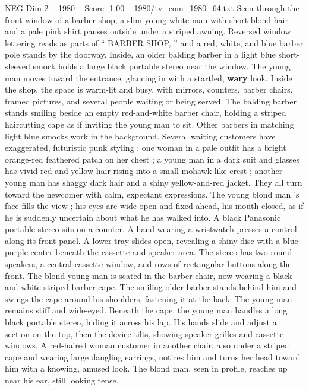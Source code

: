 \begin{textsample}{NEG Dim 2 – 1980 – Score -1.00 – 1980/tv\_com\_1980\_64.txt}  \label{ex:f2_neg_033}
Seen through the front window of a barber shop, a slim young white man with short blond hair and a pale pink shirt pauses outside under a striped awning.
Reversed window lettering reads as parts of “ BARBER SHOP, ” and a red, white, and blue barber pole stands by the doorway.
Inside, an older balding barber in a light blue short-sleeved smock holds a large black portable stereo near the window.
The young man moves toward the entrance, glancing in with a startled, \textbf{wary} look.
Inside the shop, the space is warm-lit and busy, with mirrors, counters, barber chairs, framed pictures, and several people waiting or being served.
The balding barber stands smiling beside an empty red-and-white barber chair, holding a striped haircutting cape as if inviting the young man to sit.
Other barbers in matching light blue smocks work in the background.
Several waiting customers have exaggerated, futuristic punk styling : one woman in a pale outfit has a bright orange-red feathered patch on her chest ; a young man in a dark suit and glasses has vivid red-and-yellow hair rising into a small mohawk-like crest ; another young man has shaggy dark hair and a shiny yellow-and-red jacket.
They all turn toward the newcomer with calm, expectant expressions.
The young blond man ’s face fills the view ; his eyes are wide open and fixed ahead, his mouth closed, as if he is suddenly uncertain about what he has walked into.
A black Panasonic portable stereo sits on a counter.
A hand wearing a wristwatch presses a control along its front panel.
A lower tray slides open, revealing a shiny disc with a blue-purple center beneath the cassette and speaker area.
The stereo has two round speakers, a central cassette window, and rows of rectangular buttons along the front.
The blond young man is seated in the barber chair, now wearing a black-and-white striped barber cape.
The smiling older barber stands behind him and swings the cape around his shoulders, fastening it at the back.
The young man remains stiff and wide-eyed.
Beneath the cape, the young man handles a long black portable stereo, hiding it across his lap.
His hands slide and adjust a section on the top, then the device tilts, showing speaker grilles and cassette windows.
A red-haired woman customer in another chair, also under a striped cape and wearing large dangling earrings, notices him and turns her head toward him with a knowing, amused look.
The blond man, seen in profile, reaches up near his ear, still looking tense.

\end{textsample}
